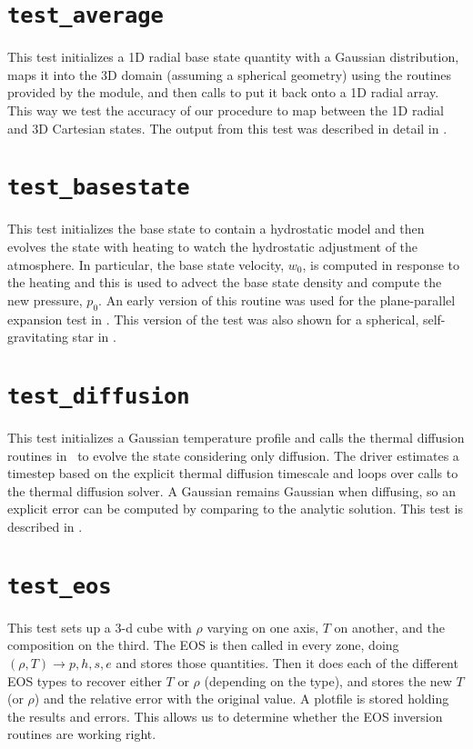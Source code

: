 \section {\tt test\_average} 

  This test initializes a 1D radial base state quantity with a
  Gaussian distribution, maps it into the 3D domain (assuming a
  spherical geometry) using the routines provided by
  the  module, and then calls  to
  put it back onto a 1D radial array.  This way we test the accuracy
  of our procedure to map between the 1D radial and 3D Cartesian
  states.  The output from this test was described in detail
  in \cite{multilevel}.


\section {\tt test\_basestate} 

  This test initializes the base state to contain a hydrostatic
  model and then evolves the state with heating to watch the 
  hydrostatic adjustment of the atmosphere.  In particular,
  the base state velocity, $w_0$, is computed in response to 
  the heating and this is used to advect the base state density
  and compute the new pressure, $p_0$.  An early version of 
  this routine was used for the plane-parallel expansion test
  in \cite{lowMach2}.  This version of the test was also shown
  for a spherical, self-gravitating star in \cite{multilevel}.

  
\section {\tt test\_diffusion}

  This test initializes a Gaussian temperature profile and calls
  the thermal diffusion routines in \maestro\ to evolve the state 
  considering only diffusion.  The driver estimates a timestep
  based on the explicit thermal diffusion timescale and loops
  over calls to the thermal diffusion solver.  A Gaussian remains
  Gaussian when diffusing, so an explicit error can be computed
  by comparing to the analytic solution.  This test is 
  described in \cite{xrb}.


\section {\tt test\_eos}

  This test sets up a 3-d cube with $\rho$ varying on one axis, $T$ on
  another, and the composition on the third.  The EOS is then called
  in every zone, doing $(\rho, T) \rightarrow  p, h, s, e$  and stores those
  quantities.  Then it does each of the different EOS types to recover
  either $T$ or $\rho$ (depending on the type), and stores the new $T$ (or
  $\rho$) and the relative error with the original value.  A plotfile is
  stored holding the results and errors.  This allows us to determine
  whether the EOS inversion routines are working right.


